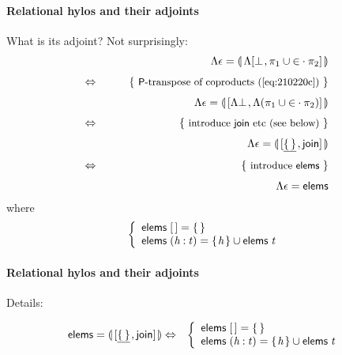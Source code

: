 \documentclass{elsarticle}
\newcommand{\Varid}[1]{\mathit{#1}}
\newenvironment{lcbr}{\left\{\begin{array}{l}}{\end{array}\right.}
\def\alt#1#2{\mathopen{[}#1\hskip 1pt,#2\mathclose{]}}
\def\comp{ \mathbin{\cdot} }
\def\fun#1{\mathsf{#1}}
\def\just#1#2{\\ &#1& \rule{2em}{0pt} \{ \mbox{\rule[-.7em]{0pt}{1.8em} \small #2 \/} \} \nonumber\\ && }
\def\p#1{\pi_{#1}}
\let\kons=\underline
\def\start{&&}
\def\equiv{\Leftrightarrow}
\begin{document}
\paragraph{Relational hylos and their adjoints}
What is its adjoint? Not surprisingly:
\begin{eqnarray}
\start
	\ensuremath{\Lambda{\mathbin\epsilon }\mathrel{=}\llparenthesis\,\Lambda{\alt{\bot }{{\p1}\mathbin\cup{\mathbin\in  \comp \p2}}}\,\rrparenthesis}
	\nonumber
%
\just\equiv{ \ensuremath{\fun P }-transpose of coproducts (\ref{eq:210220c}) }
%
	\ensuremath{\Lambda{\mathbin\epsilon }\mathrel{=}\llparenthesis\,\alt{\Lambda{\bot }}{\Lambda{({\p1}\mathbin\cup{\mathbin\in  \comp \p2})}}\,\rrparenthesis}
	\nonumber
%
\just\equiv{ introduce \ensuremath{\mathsf{join}} etc (see below) }
%
	\ensuremath{\Lambda{\mathbin\epsilon }\mathrel{=}\llparenthesis\,\alt{\kons{\{\mskip1.5mu \mskip1.5mu\}}}{\mathsf{join}}\,\rrparenthesis}
	\nonumber
%
\just\equiv{ introduce \ensuremath{\mathsf{elems}} }
%
	\ensuremath{\Lambda{\mathbin\epsilon }\mathrel{=}\mathsf{elems}}
	\label{eq:210826a}
%
\end{eqnarray}
where
\begin{eqnarray*}
	\ensuremath{\begin{lcbr}\mathsf{elems}\;[\mskip1.5mu \mskip1.5mu]\mathrel{=}\{\mskip1.5mu \mskip1.5mu\}\\\mathsf{elems}\;(\Varid{h}\mathbin{:}\Varid{t})\mathrel{=}\{\mskip1.5mu \Varid{h}\mskip1.5mu\}\cup \mathsf{elems}\;\Varid{t}\end{lcbr}}
\end{eqnarray*}

%

\paragraph{Relational hylos and their adjoints}

Details:

\begin{eqnarray*}
%
	\ensuremath{\mathsf{elems}\mathrel{=}\llparenthesis\,\alt{\kons{\{\mskip1.5mu \mskip1.5mu\}}}{\mathsf{join}}\,\rrparenthesis}
&
	\equiv
&
	\ensuremath{\begin{lcbr}\mathsf{elems}\;[\mskip1.5mu \mskip1.5mu]\mathrel{=}\{\mskip1.5mu \mskip1.5mu\}\\\mathsf{elems}\;(\Varid{h}\mathbin{:}\Varid{t})\mathrel{=}\{\mskip1.5mu \Varid{h}\mskip1.5mu\}\cup \mathsf{elems}\;\Varid{t}\end{lcbr}}
\end{eqnarray*}
\end{document}
